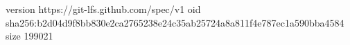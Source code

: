 version https://git-lfs.github.com/spec/v1
oid sha256:b2d04d9f8bb830e2ca2765238e24c35ab25724a8a811f4e787ec1a590bba4584
size 199021

